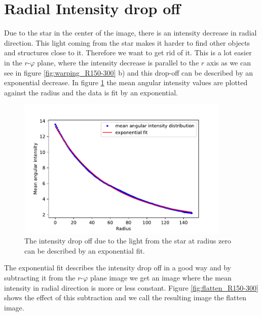 \section{Radial Intensity drop off}
Due to the star in the center of the image, there is an intensity decrease in radial direction. This light coming from the star makes it harder to find other objects and structures close to it. Therefore we want to get rid of it. This is a lot easier in the $r$-$\varphi$ plane, where the intensity decrease is parallel to the $r$ axis as we can see in figure \ref{fig:warping_R150-300} b) and this drop-off can be described by an exponential decrease. In figure \ref{fig:mean_angular_intensity_R150_300} the mean angular intensity values are plotted against the radius and the data is fit by an exponential.
\begin{figure}[H]
	\centering
		\includegraphics[width=0.9\textwidth]{pics/mean_angular_intensity_R150_300.pdf}
\caption{The intensity drop off due to the light from the star at radius zero can be described by an exponential fit.}
\label{fig:mean_angular_intensity_R150_300}
\end{figure}
The exponential fit describes the intensity drop off in a good way and by subtracting it from the $r$-$\varphi$ plane image we get an image where the mean intensity in radial direction is more or less constant. Figure \ref{fig:flatten_R150-300} shows the effect of this subtraction and we call the resulting image the flatten image.  
